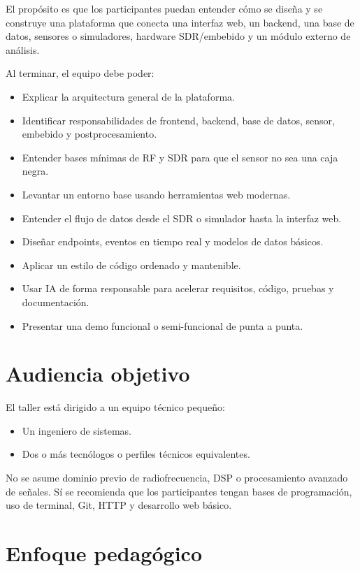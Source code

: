 \documentclass[11pt,a4paper]{article}
\begin{document}
El propósito es que los participantes puedan entender cómo se diseña y se construye una plataforma que conecta una interfaz web, un backend, una base de datos, sensores o simuladores, hardware SDR/embebido y un módulo externo de análisis.

Al terminar, el equipo debe poder:

\begin{itemize}
  \item Explicar la arquitectura general de la plataforma.
  \item Identificar responsabilidades de frontend, backend, base de datos, sensor, embebido y postprocesamiento.
  \item Entender bases mínimas de RF y SDR para que el sensor no sea una caja negra.
  \item Levantar un entorno base usando herramientas web modernas.
  \item Entender el flujo de datos desde el SDR o simulador hasta la interfaz web.
  \item Diseñar endpoints, eventos en tiempo real y modelos de datos básicos.
  \item Aplicar un estilo de código ordenado y mantenible.
  \item Usar IA de forma responsable para acelerar requisitos, código, pruebas y documentación.
  \item Presentar una demo funcional o semi-funcional de punta a punta.
\end{itemize}

\section*{Audiencia objetivo}

El taller está dirigido a un equipo técnico pequeño:

\begin{itemize}
  \item Un ingeniero de sistemas.
  \item Dos o más tecnólogos o perfiles técnicos equivalentes.
\end{itemize}

No se asume dominio previo de radiofrecuencia, DSP o procesamiento avanzado de señales. Sí se recomienda que los participantes tengan bases de programación, uso de terminal, Git, HTTP y desarrollo web básico.

\section*{Enfoque pedagógico}
\end{document}
